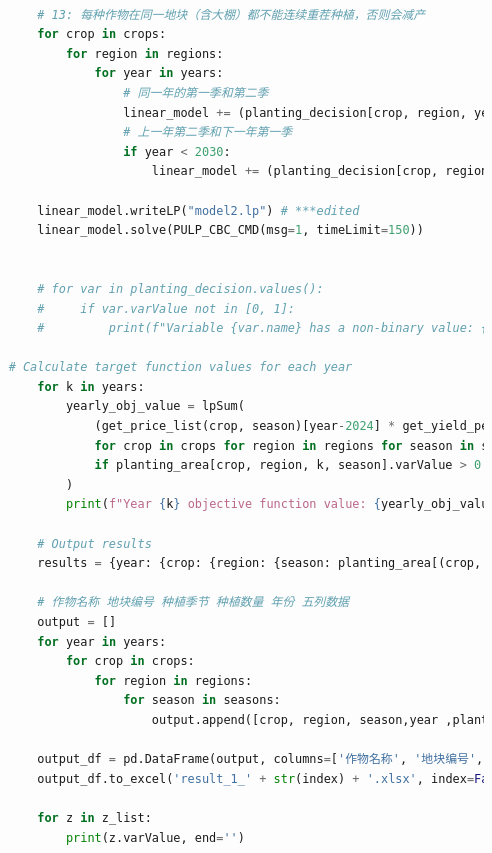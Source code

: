 \documentclass{cumcmthesis}
\begin{document}
\begin{appendices}
\begin{lstlisting}[language=python]
        
        # 13: 每种作物在同一地块（含大棚）都不能连续重茬种植，否则会减产
        for crop in crops:
            for region in regions:
                for year in years:
                    # 同一年的第一季和第二季
                    linear_model += (planting_decision[crop, region, year, '第一季'] + planting_decision[crop, region, year, '第二季'] <= 1)
                    # 上一年第二季和下一年第一季
                    if year < 2030:
                        linear_model += (planting_decision[crop, region, year, '第二季'] + planting_decision[crop, region, year+1, '第一季'] <= 1)
    
        linear_model.writeLP("model2.lp") # ***edited
        linear_model.solve(PULP_CBC_CMD(msg=1, timeLimit=150))
    
    
        # for var in planting_decision.values():
        #     if var.varValue not in [0, 1]:
        #         print(f"Variable {var.name} has a non-binary value: {var.varValue}")
    
    # Calculate target function values for each year
        for k in years:
            yearly_obj_value = lpSum(
                (get_price_list(crop, season)[year-2024] * get_yield_per_acre_list(crop, region)[year-2024] - get_cost_list(crop, region)[year-2024]) * planting_area[crop, region, k, season].varValue
                for crop in crops for region in regions for season in seasons
                if planting_area[crop, region, k, season].varValue > 0  # Only consider variables with planting area greater than 0
            )
            print(f"Year {k} objective function value: {yearly_obj_value}")
    
        # Output results
        results = {year: {crop: {region: {season: planting_area[(crop, region, year, season)].varValue for season in seasons} for region in regions} for crop in crops} for year in years}
    
        # 作物名称 地块编号 种植季节 种植数量 年份 五列数据
        output = []
        for year in years:
            for crop in crops:
                for region in regions:
                    for season in seasons:
                        output.append([crop, region, season,year ,planting_area[(crop, region, year, season)].varValue])
    
        output_df = pd.DataFrame(output, columns=['作物名称', '地块编号', '种植季节','年份', '种植数量'])
        output_df.to_excel('result_1_' + str(index) + '.xlsx', index=False)
    
        for z in z_list:
            print(z.varValue, end='')
    

\end{lstlisting}
\end{appendices}
\end{document}
